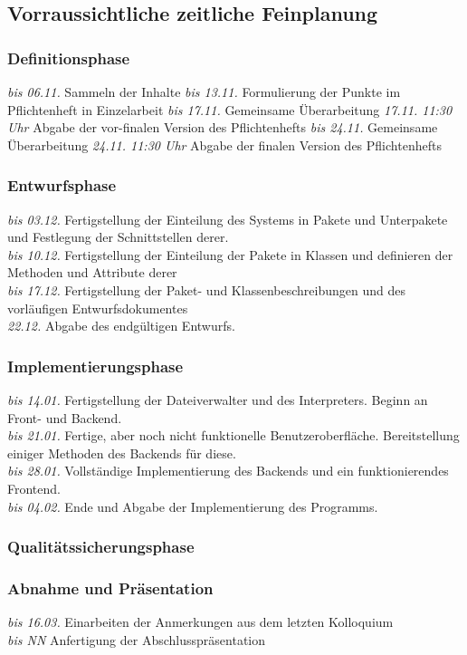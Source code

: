 \documentclass[parskip=full]{scrartcl}
\begin{document}
\subsection{Vorraussichtliche zeitliche Feinplanung}
\subsubsection{Definitionsphase}
\textit{bis 06.11.} Sammeln der Inhalte
\textit{bis 13.11.} Formulierung der Punkte im Pflichtenheft in Einzelarbeit
\textit{bis 17.11.} Gemeinsame Überarbeitung
\textit{17.11. 11:30 Uhr} Abgabe der vor-finalen Version des Pflichtenhefts
\textit{bis 24.11.} Gemeinsame Überarbeitung
\textit{24.11. 11:30 Uhr} Abgabe der finalen Version des Pflichtenhefts 

\subsubsection{Entwurfsphase}
\textit{bis 03.12.} Fertigstellung der Einteilung des Systems in Pakete und Unterpakete und Festlegung der Schnittstellen derer. \\
\textit{bis 10.12.} Fertigstellung der Einteilung der Pakete in Klassen und definieren der Methoden und Attribute derer \\
\textit{bis 17.12.} Fertigstellung der Paket- und Klassenbeschreibungen und des vorläufigen Entwurfsdokumentes\\
\textit{22.12.} Abgabe des endgültigen Entwurfs. 

\subsubsection{Implementierungsphase}
\textit{bis 14.01.} Fertigstellung der Dateiverwalter und des Interpreters. Beginn an Front- und Backend.\\
\textit{bis 21.01.} Fertige, aber noch nicht funktionelle Benutzeroberfläche. Bereitstellung einiger Methoden des Backends für diese.\\
\textit{bis 28.01.} Vollständige Implementierung des Backends und ein funktionierendes Frontend.\\
\textit{bis 04.02.} Ende und Abgabe der Implementierung des Programms.

\subsubsection{Qualitätssicherungsphase}

\subsubsection{Abnahme und Präsentation }
\textit{bis 16.03.} Einarbeiten der Anmerkungen aus dem letzten Kolloquium \\
\textit{bis NN} Anfertigung der Abschlusspräsentation
\end{document}
